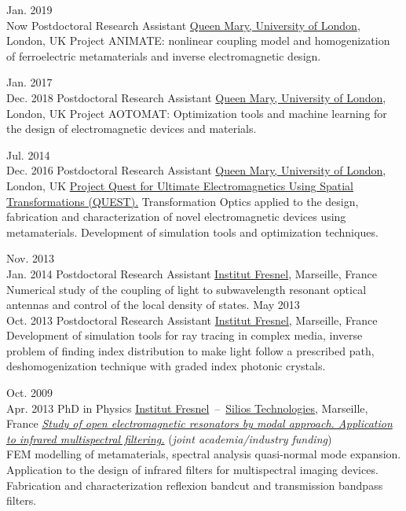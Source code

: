 \documentclass[]{cv} %
\begin{document}
\begin{entrylist}



\entry
{Jan. 2019 \\Now}
{Postdoctoral Research Assistant}
{\href{http://antennas.eecs.qmul.ac.uk/}{Queen Mary, University of London}, London, UK}
{Project ANIMATE: nonlinear coupling model and homogenization of ferroelectric 
metamaterials and inverse electromagnetic design.
}


\entry
{Jan. 2017 \\Dec. 2018}
{Postdoctoral Research Assistant}
{\href{http://antennas.eecs.qmul.ac.uk/}{Queen Mary, University of London}, London, UK}
{Project AOTOMAT: Optimization tools and machine learning for the design of electromagnetic
devices and materials.
}

\entry
{Jul. 2014 \\Dec. 2016}
{Postdoctoral Research Assistant}
{\href{http://antennas.eecs.qmul.ac.uk/}{Queen Mary, University of London}, London, UK}
{\href{http://www.quest-spatial-transformation.org/}{Project Quest for Ultimate Electromagnetics Using Spatial Transformations (QUEST).}
Transformation Optics applied to the design, fabrication and characterization of novel electromagnetic devices using metamaterials.
Development of simulation tools and optimization techniques.
}


\entry
{Nov. 2013\\ Jan. 2014}
{Postdoctoral Research Assistant}
{\href{http://www.fresnel.fr/}{Institut Fresnel}, Marseille, France}
{
Numerical study of the coupling of light
to subwavelength resonant optical antennas and control of the local density of states.
}
\entry
{May 2013 \\Oct. 2013}
{Postdoctoral Research Assistant}
{\href{http://www.fresnel.fr/}{Institut Fresnel}, Marseille, France}
{
Development of simulation tools for ray tracing in complex media, inverse problem of
finding index distribution to make light follow a prescribed path, deshomogenization
technique with graded index photonic crystals.
}

\entry
{Oct. 2009\\Apr. 2013}
{PhD in Physics}
{\href{http://www.fresnel.fr/}{Institut Fresnel}~--~\href{http://www.silios.com/}{Silios Technologies}, Marseille, France}
{\emph{\href{http://tel.archives-ouvertes.fr/index.php?halsid=slas337fv1oqlj1okgkq7q42i5&view_this_doc=tel-00918651&version=1}
{Study of open electromagnetic resonators by modal approach.
Application to infrared multispectral filtering.}} (\emph{joint academia/industry funding})\\
FEM modelling of metamaterials, spectral analysis quasi-normal mode expansion.
Application to the design of infrared filters for multispectral imaging devices.
Fabrication and characterization reflexion bandcut and transmission bandpass filters.
}



\end{entrylist}
\end{document}

